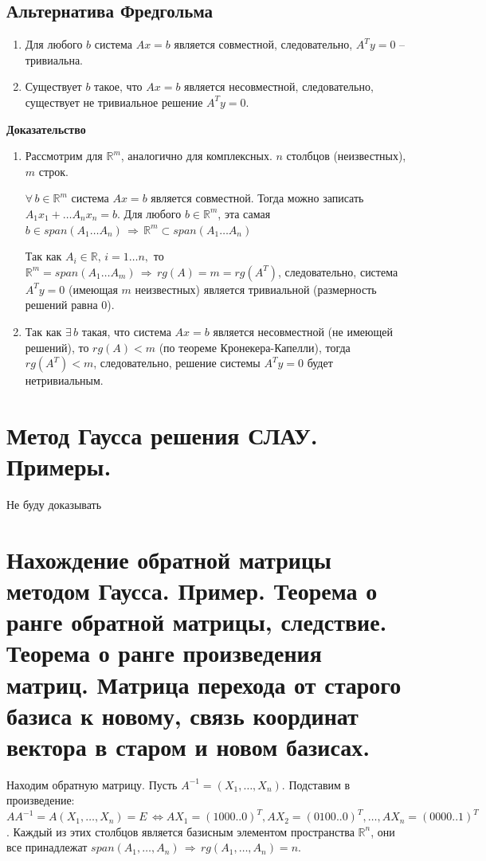 \documentclass{article}
\newcommand{\R}{\mathbb R}
\begin{document}
\subsection{Альтернатива Фредгольма}
\begin{enumerate}
    \item Для любого $b$ система $Ax=b$ является совместной, следовательно, $A^T y=0$ -- тривиальна.
    \item Существует $b$ такое, что $Ax=b$ является несовместной, следовательно, существует не тривиальное решение $A^T y=0$.
    
\end{enumerate}
\textbf{Доказательство}
\begin{enumerate}
    \item Рассмотрим для $\R^m$, аналогично для комплексных. $n$ столбцов (неизвестных), $m$ строк.
    
    $\forall\,b\in\R^m$ система $Ax=b$ является совместной. Тогда можно записать $A_1x_1+\ldots A_n x_n=b$. Для любого $b\in\R^m$, эта самая $b\in span(A_1\ldots A_n)\,\Rightarrow\,\R^m\subset span(A_1\ldots A_n)$
    
    Так как $A_i\in\R,\,i=1\ldots n,$ то $\R^m=span(A_1\ldots A_m)\,\Rightarrow\,rg(A)=m=rg(A^T)$, следовательно, система $A^Ty=0$ (имеющая $m$ неизвестных) является тривиальной (размерность решений равна $0$).
    
    \item Так как $\exists\, b$ такая, что система $Ax=b$ является несовместной (не имеющей решений), то $rg(A)<m$ (по теореме Кронекера-Капелли), тогда $rg(A^T)<m$, следовательно, решение системы $A^T y=0$ будет нетривиальным.
\end{enumerate}

\newpage
\section{Метод Гаусса решения СЛАУ. Примеры.}
Не буду доказывать

\newpage
\section{Нахождение обратной матрицы методом Гаусса. Пример. Теорема о ранге обратной матрицы, следствие. Теорема о ранге произведения матриц. Матрица перехода от старого базиса к новому, связь координат вектора в старом и новом базисах.}
Находим обратную матрицу.
Пусть $A^{-1} = (X_1,\ldots,X_n)$. Подставим в произведение: $AA^{-1} = A(X_1,\ldots,X_n) = E\,\Leftrightarrow AX_1 =
(1000..0)^T , AX_2 = (0100..0)^T ,\ldots, AX_n = (0000..1)^T$. Каждый из этих столбцов является базисным элементом пространства $\R^n$, они все принадлежат $span(A_1,\ldots, A_n)\,\Rightarrow\, rg(A_1, \ldots,A_n) = n$.
\end{document}
